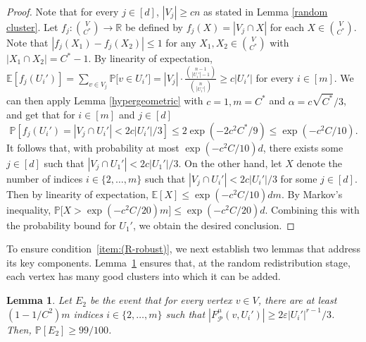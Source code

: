 \documentclass[11pt, letterpaper]{amsart}
\theoremstyle{plain}
\numberwithin{equation}{section}
\newtheorem{lemma}[thm]{Lemma}
\theoremstyle{definition}
\newcommand\card[1]{\left| #1 \right|}
\begin{document}
\begin{proof}
Note that for every $j\in[d]$, $ \card{V_j}\ge cn$  as stated in Lemma \ref{random cluster}.
        Let $f_j:\binom{V}{C^*}\rightarrow\mathbb{R}$ be defined by $f_j(X)=|V_j\cap X|$ for each $X\in \binom{V}{C^*}$. Note that $|f_j(X_1)-f_j(X_2)|\le 1$ for any $X_1,X_2\in \binom{V}{C^*}$ with $|X_1\cap X_2|=C^*-1$. 
        By linearity of expectation, $\mathbb{E}[f_j(U_i')]=\sum_{v\in V_j}\mathbb{P}\big[v\in U_i'\big]=|V_j|\cdot\frac{\binom{n-1}{\card{U_i'}-1}}{\binom{n}{\card{U_i'}}}\ge c\card{U_i'}$ for every $i\in[m]$. 
        We can then apply Lemma \ref{hypergeometric} with $c=1, m=C^*$ and $\alpha=c\sqrt{C^*}/3$, and get that for $i\in [m]$ and $j\in [d]$
\[\mathbb{P}\left[f_j(U_i')=|V_j\cap U_i'|<2c|U_i'|/3\right]\le 2\exp{(-2c^2C^*/9)}\le \exp{(-c^2C/10)}.
\]
It follows that, with probability at most \(\exp{(-c^2C/10)}d\), there exists some \(j\in [d]\) such that $|V_j\cap U_1'|<2c|U_1'|/3$. 
        On the other hand, let $X$ denote the number of indices \(i\in \{2,\dots,m\}\) such that $|V_j\cap U_i'|<2c|U_i'|/3$ for some $j\in [d]$. 
Then by linearity of expectation, $\mathbb{E}[X]\le \exp{(-c^2C/10)}dm.$ 
By Markov's inequality, $\mathbb{P}\big[X>\exp{(-c^2C/20)}m\big]\le \exp{(-c^2C/20)}d.$ 
        Combining this with the probability bound for \(U_1'\), we obtain the desired conclusion.
    \end{proof}


    To ensure condition~\ref{item:(R-robust)}, we next establish two lemmas that address its key components. 
Lemma~\ref{robust edge of random cluster d(v)} ensures that, at the random redistribution stage, each vertex has many good clusters into which it can be added.     

    \begin{lemma}\label{robust edge of random cluster d(v)}
        Let $E_2$ be the event that for every vertex $v\in V$, there are at least $(1-1/C^2)m$ indices \(i\in \{2,\dots,m\}\) such that $|F^{\mu}_{\mathcal{P}}(v,U_i')|\ge 2\varepsilon{\card{U_i'}}^{r-1}/3$. Then, $\mathbb{P}\left[E_2\right]\ge 99/100$.
    \end{lemma}
    
\end{document}
